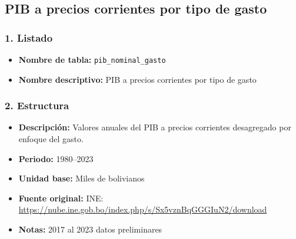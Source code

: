 \documentclass[12pt,a4paper]{article}
\begin{document}
\subsection{PIB a precios corrientes por tipo de gasto}

\subsubsection*{1. Listado}
\begin{itemize}
  \item \textbf{Nombre de tabla:} \texttt{pib\_nominal\_gasto}
  \item \textbf{Nombre descriptivo:} PIB a precios corrientes por tipo de gasto
\end{itemize}

\subsubsection*{2. Estructura}
\begin{itemize}
  \item \textbf{Descripción:} Valores anuales del PIB a precios corrientes desagregado por enfoque del gasto.
  \item \textbf{Periodo:} 1980–2023
  \item \textbf{Unidad base:} Miles de bolivianos
  \item \textbf{Fuente original:} INE:\\
    \url{https://nube.ine.gob.bo/index.php/s/Sx5vznBqGGGIuN2/download}
  \item \textbf{Notas:} 2017 al 2023 datos preliminares
\end{itemize}
\end{document}
